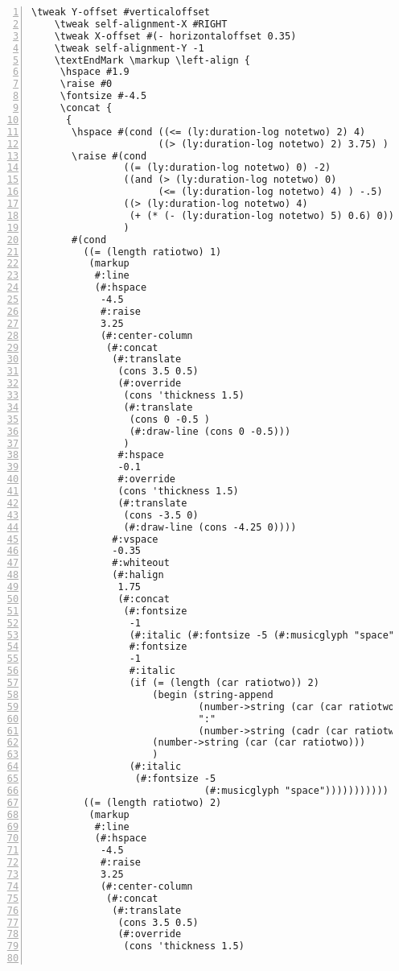 \begin{Verbatim}[numbers=left,xleftmargin=5mm]
    \tweak Y-offset #verticaloffset
    \tweak self-alignment-X #RIGHT
    \tweak X-offset #(- horizontaloffset 0.35)
    \tweak self-alignment-Y -1
    \textEndMark \markup \left-align {
     \hspace #1.9
     \raise #0
     \fontsize #-4.5
     \concat {
      {
       \hspace #(cond ((<= (ly:duration-log notetwo) 2) 4)
                      ((> (ly:duration-log notetwo) 2) 3.75) )
       \raise #(cond
                ((= (ly:duration-log notetwo) 0) -2)
                ((and (> (ly:duration-log notetwo) 0)
                      (<= (ly:duration-log notetwo) 4) ) -.5)
                ((> (ly:duration-log notetwo) 4)
                 (+ (* (- (ly:duration-log notetwo) 5) 0.6) 0))
                )
       #(cond
         ((= (length ratiotwo) 1)
          (markup
           #:line
           (#:hspace
            -4.5
            #:raise
            3.25
            (#:center-column
             (#:concat
              (#:translate
               (cons 3.5 0.5)
               (#:override
                (cons 'thickness 1.5)
                (#:translate
                 (cons 0 -0.5 )
                 (#:draw-line (cons 0 -0.5)))
                )
               #:hspace
               -0.1
               #:override
               (cons 'thickness 1.5)
               (#:translate
                (cons -3.5 0)
                (#:draw-line (cons -4.25 0))))
              #:vspace
              -0.35
              #:whiteout
              (#:halign
               1.75
               (#:concat
                (#:fontsize
                 -1
                 (#:italic (#:fontsize -5 (#:musicglyph "space")))
                 #:fontsize
                 -1
                 #:italic
                 (if (= (length (car ratiotwo)) 2)
                     (begin (string-append
                             (number->string (car (car ratiotwo)))
                             ":"
                             (number->string (cadr (car ratiotwo))))  )
                     (number->string (car (car ratiotwo)))
                     )
                 (#:italic
                  (#:fontsize -5
                              (#:musicglyph "space")))))))))))
         ((= (length ratiotwo) 2)
          (markup
           #:line
           (#:hspace
            -4.5
            #:raise
            3.25
            (#:center-column
             (#:concat
              (#:translate
               (cons 3.5 0.5)
               (#:override
                (cons 'thickness 1.5)


\end{Verbatim}
